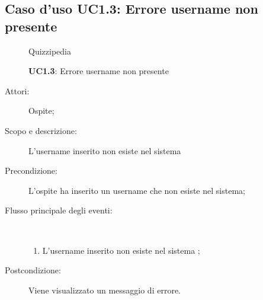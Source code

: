 \subsection{Caso d'uso UC1.3: Errore username non presente}
	\begin{figure}[H]
		\centering
		\begin{resizedtikzpicture}{\textwidth}
		\begin{umlsystem}[x=0, fill=lightgray!20]{Quizzipedia}
		\end{umlsystem}
		\end{resizedtikzpicture}
		\caption{\textbf{UC1.3}: Errore username non presente}
		\label{UC1.3}
	\end{figure}
\begin{description}
\item[Attori:] Ospite;
\item[Scopo e descrizione:] L'username inserito non esiste nel sistema
      \item[Precondizione:] L'ospite ha inserito un username che non esiste nel sistema;

        \item[Flusso principale degli eventi:] \ 
 \begin{enumerate}
          \item L'username inserito non esiste nel sistema
;

      \end{enumerate}
    \item[Postcondizione:] Viene visualizzato un messaggio di errore.
  \end{description}
\hypertarget{UC1.4}{}
